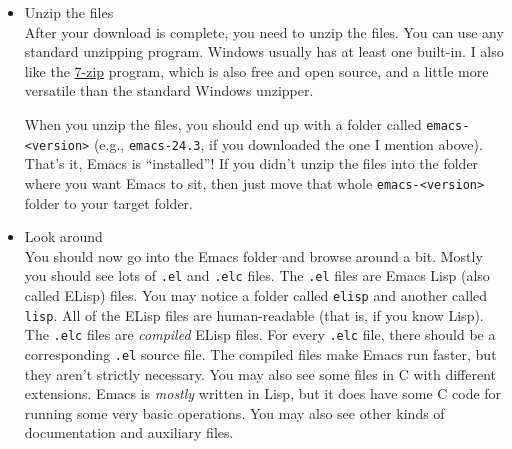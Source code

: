 \documentclass{article}
\begin{document}
\begin{itemize}
Which one do you get?  You typically should just get the most recent version, because only stable versions are released as Windows binaries; if you want the bleeding edge ``development'' version of Emacs, you are going to have to learn to obtain that and build it from source on your own.  At the time I'm writing this, the most recent stable release is 24.3.  But if you see a 24.4 or 25 or whatever, go for that.  And you want the file that ends in \texttt{.zip}, not \texttt{.zip.sig}.  So at the time of writing, I see a file called \texttt{emacs-24.3-bin-i386.zip}, and that's what I would get.  The \texttt{bin} tells you it's got binaries in it, and the \texttt{i386} tells you that it's built for the i386 computing architecture, which is the common 32-bit Windows architecture.\footnote{Technically, \texttt{i386} refers specifically to Intel processors, but this kind of architecture is essentially the common denominator for any Windows-running PC, and this Emacs version runs perfectly well with my computer, which has a 64-bit AMD processor. However, these binaries may or may not run on ARM processors, which are common in mobile devices like tablets, including the Microsoft Surface RT.  Maybe Emacs runs on those, but I haven't tried or researched it much. Running Emacs on a tablet doesn't sound very appealing, anyway.
 } So click the link and download it!  The version I see has a 47 MB download.

\item Unzip the files\\
\label{sec-3-2-2-3}%
After your download is complete, you need to unzip the files. You can use any standard unzipping program. Windows usually has at least one built-in.  I also like the \href{http://www.7-zip.org/}{7-zip} program, which is also free and open source, and a little more versatile than the standard Windows unzipper.

When you unzip the files, you should end up with a folder called \texttt{emacs-<version>} (e.g., \texttt{emacs-24.3}, if you downloaded the one I mention above). That's it, Emacs is ``installed''! If you didn't unzip the files into the folder where you want Emacs to sit, then just move that whole \texttt{emacs-<version>} folder to your target folder.

\item Look around\\
\label{sec-3-2-2-4}%
You should now go into the Emacs folder and browse around a bit. Mostly you should see lots of \texttt{.el} and \texttt{.elc} files.  The \texttt{.el} files are Emacs Lisp (also called ELisp) files.  You may notice a folder called \texttt{elisp} and another called \texttt{lisp}. All of the ELisp files are human-readable (that is, if you know Lisp).  The \texttt{.elc} files are \emph{compiled} ELisp files.  For every \texttt{.elc} file, there should be a corresponding \texttt{.el} source file. The compiled files make Emacs run faster, but they aren't strictly necessary.  You may also see some files in C with different extensions.  Emacs is \emph{mostly} written in Lisp, but it does have some C code for running some very basic operations.  You may also see other kinds of documentation and auxiliary files.


\end{itemize}
\end{document}
